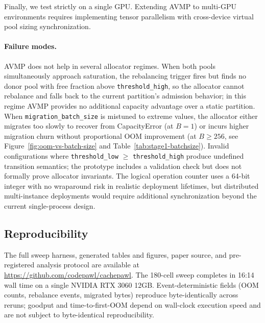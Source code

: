 Finally, we test strictly on a single GPU. Extending AVMP to multi-GPU environments requires implementing tensor parallelism with cross-device virtual pool sizing synchronization.

\paragraph{Failure modes.}
AVMP does not help in several allocator regimes. When both pools simultaneously approach saturation, the rebalancing trigger fires but finds no donor pool with free fraction above \texttt{threshold\_high}, so the allocator cannot rebalance and falls back to the current partition's admission behavior; in this regime AVMP provides no additional capacity advantage over a static partition. When \texttt{migration\_batch\_size} is mistuned to extreme values, the allocator either migrates too slowly to recover from CapacityError (at $B=1$) or incurs higher migration churn without proportional OOM improvement (at $B \geq 256$, see Figure~\ref{fig:oom-vs-batch-size} and Table~\ref{tab:stage1-batchsize}). Invalid configurations where \texttt{threshold\_low} $\geq$ \texttt{threshold\_high} produce undefined transition semantics; the prototype includes a validation check but does not formally prove allocator invariants. The logical operation counter uses a 64-bit integer with no wraparound risk in realistic deployment lifetimes, but distributed multi-instance deployments would require additional synchronization beyond the current single-process design.

\subsection{Reproducibility}
\label{sec:eval:reproducibility}

The full sweep harness, generated tables and figures, paper source, and pre-registered analysis protocol are available at \url{https://github.com/codepawl/cachepawl}. The 180-cell sweep completes in 16:14 wall time on a single NVIDIA RTX 3060 12GB. Event-deterministic fields (OOM counts, rebalance events, migrated bytes) reproduce byte-identically across reruns; goodput and time-to-first-OOM depend on wall-clock execution speed and are not subject to byte-identical reproducibility.
